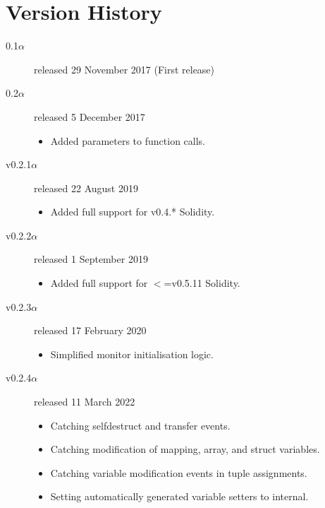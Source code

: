 \documentclass{article}
\begin{document}
  \section{Version History}
\begin{description}
\item[0.1$\alpha$] released 29 November 2017 (First release)
\item[0.2$\alpha$] released 5 December 2017
\begin{itemize}
  \item Added parameters to function calls.
\end{itemize}
\item[v0.2.1$\alpha$] released 22 August 2019
\begin{itemize}
  \item Added full support for v0.4.* Solidity.
\end{itemize}
\item[v0.2.2$\alpha$] released 1 September 2019
\begin{itemize}
  \item Added full support for $<$=v0.5.11 Solidity.
\end{itemize}
\item[v0.2.3$\alpha$] released 17 February 2020
\begin{itemize}
  \item Simplified monitor initialisation logic.
\end{itemize}
\item[v0.2.4$\alpha$] released 11 March 2022
  \begin{itemize}
  	\item Catching selfdestruct and transfer events.
  	\item Catching modification of mapping, array, and struct variables.
  	\item Catching variable modification events in tuple assignments.
  	\item Setting automatically generated variable setters to internal.
\end{itemize}
\end{description}

  
\end{document}
